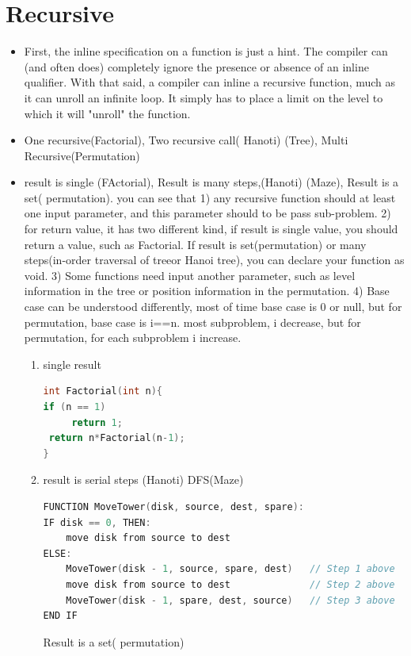 \documentclass[a4paper,11pt,twoside]{book}
\begin{document}
\section{Recursive}
\begin{itemize}

\item First, the inline specification on a function is just a hint. The compiler can (and often does) completely ignore the presence or absence of an inline qualifier. With that said, a compiler can inline a recursive function, much as it can unroll an infinite loop. It simply has to place a limit on the level to which it will "unroll" the function.



\item One recursive(Factorial),  Two recursive call( Hanoti) (Tree), Multi Recursive(Permutation)

\item result is single (FActorial), Result is many steps,(Hanoti) (Maze), Result is a set( permutation). you can see that 1) any recursive function should at least one input parameter, and this parameter should to be pass sub-problem. 2) for return value, it has two different kind, if result is single value, you should return a value, such as Factorial. If result is set(permutation) or many steps(in-order traversal of treeor Hanoi tree), you can declare your function as void. 3) Some functions need input another parameter, such as level information in the tree or position information in the permutation. 4) Base case can be understood differently, most of time base case is 0 or null, but for permutation, base case is i==n.  most subproblem, i decrease, but for permutation, for each subproblem i increase. 
\begin{enumerate}
\item single result 
\begin{lstlisting}[frame=single, language=c++]
int Factorial(int n){
if (n == 1) 
     return 1;
 return n*Factorial(n-1);
}
\end{lstlisting}
\item result is serial steps (Hanoti) DFS(Maze)
\begin{lstlisting}[frame=single, language=c++]
FUNCTION MoveTower(disk, source, dest, spare):
IF disk == 0, THEN:
    move disk from source to dest
ELSE:
    MoveTower(disk - 1, source, spare, dest)   // Step 1 above
    move disk from source to dest              // Step 2 above
    MoveTower(disk - 1, spare, dest, source)   // Step 3 above
END IF
\end{lstlisting}
Result is a set( permutation)


\end{enumerate}
\end{itemize}
\end{document}

